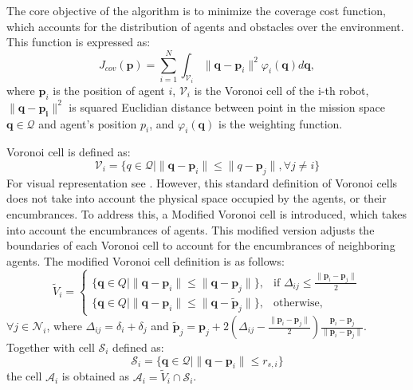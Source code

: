         The core objective of the algorithm is to minimize the coverage cost function, which accounts for the distribution of agents and obstacles over the environment. 
        This function is expressed as:
        \begin{equation}
            J_{cov}(\mathbf{p}) = \sum_{i=1}^{N} \int_{\mathcal{V}_i} \lVert\mathbf{q}-\mathbf{p}_i\rVert^2 \varphi_i (\mathbf{q})d\mathbf{q},
            \label{coverage_cost_function}
        \end{equation}
        where $\mathbf{p}_i$ is the position of agent $i$, $\mathcal{V}_i$ is the Voronoi cell of the i-th robot, $\lVert\mathbf{q}-\mathbf{p_i}\rVert^2$ is squared Euclidian distance between point in the mission space $\mathbf{q} \in \mathcal{Q}$ and agent's position $p_i$, 
        and $\varphi_i (\mathbf{q})$ is the weighting function.

        Voronoi cell is defined as: 
        \begin{equation}
            \mathcal{V}_i = \{q \in \mathcal{Q} \lvert \lVert \mathbf{q} - \mathbf{p}_i \rVert \leq \lVert q - \mathbf{p}_j \rVert, \forall j \neq i\}
        \end{equation}
        For visual representation see . 
        However, this standard definition of Voronoi cells does not take into account the physical space occupied by the agents, or their encumbrances. 
        To address this, a Modified Voronoi cell is introduced, which takes into account the encumbrances of agents.
        This modified version adjusts the boundaries of each Voronoi cell to account for the encumbrances of neighboring agents.
        The modified Voronoi cell definition is as follows:
        \begin{equation}
            \tilde{V}_i = 
            \begin{cases}
            \{ \mathbf{q} \in Q \mid \| \mathbf{q} - \mathbf{p}_i \| \leq \| \mathbf{q} - \mathbf{p}_j \| \}, & \text{if } \Delta_{ij} \leq \frac{\| \mathbf{p}_i - \mathbf{p}_j \|}{2} \\
            \{ \mathbf{q} \in Q \mid \| \mathbf{q} - \mathbf{p}_i \| \leq \| \mathbf{q} - \tilde{\mathbf{p}}_j \| \}, & \text{otherwise},
            \end{cases}
        \end{equation}
        $\forall j \in \mathcal{N}_i$, where $\Delta_{ij} = \delta_i + \delta_j$ and $\tilde{\mathbf{p}}_j = \mathbf{p}_j + 2(\Delta_{ij} - \frac{\| \mathbf{p}_i - \mathbf{p}_j \|}{2})\frac{ \mathbf{p}_i - \mathbf{p}_j }{\| \mathbf{p}_i - \mathbf{p}_j \|}$.
        Together with cell $\mathcal{S}_i$ defined as: 
        \begin{equation}
            \mathcal{S}_i = \{\mathbf{q} \in \mathcal{Q} | \| \mathbf{q} - \mathbf{p}_i \| \leq r_{s,i}\}
        \end{equation}
        the cell $\mathcal{A}_i$ is obtained as $\mathcal{A}_i = \tilde{V}_i \cap \mathcal{S}_i$.

